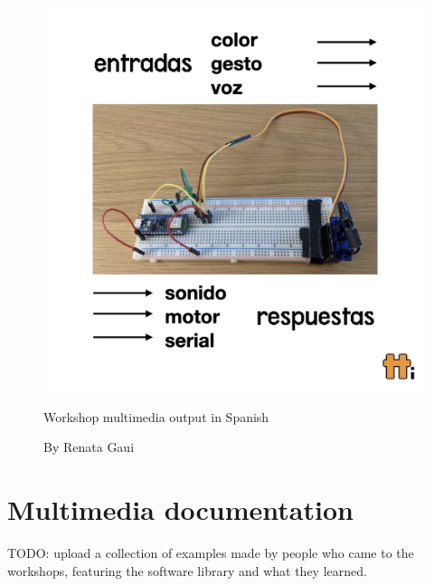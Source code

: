 \begin{figure}[ht]
  \centering
  \includegraphics[width=0.75\linewidth,height=0.35\textheight,keepaspectratio]{images/workshop-es-2.jpg}
  \caption{Workshop multimedia output in Spanish}
  \caption*{By Renata Gaui}
  \label{fig:workshop-spanish-flyer-page-2}
\end{figure}

\section{Multimedia documentation}

TODO: upload a collection of examples made by people who came to the workshops, featuring the software library and what they learned.
